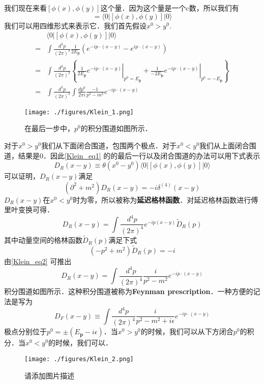 
我们现在来看$[\phi(x),\phi(y)]$这个量．因为这个量是一个c数，所以我们有
\begin{equation}
[\phi(x),\phi(y)] = \langle 0 | [\phi(x),\phi(y)] | 0 \rangle
\end{equation}
我们可以用四维形式来表示它．我们首先假设$x^0>y^0$.
\begin{equation}\label{Klein_eq1}
\begin{aligned}
& \langle 0|[\phi(x), \phi(y)]| 0\rangle\\
=&\int \frac{d^{3} p}{(2 \pi)^{3}} \frac{1}{2 E_{\mathbf{p}}}\left(e^{-i p \cdot(x-y)}-e^{i p \cdot(x-y)}\right) \\ 
=& \int \frac{d^{3} p}{(2 \pi)^{3}}\left\{\left.\frac{1}{2 E_{\mathbf{p}}} e^{-i p \cdot(x-y)}\right|_{p^{0}=E_{\mathbf{p}}}+\left.\frac{1}{-2 E_{\mathbf{p}}} e^{-i p \cdot(x-y)}\right|_{p^{0}=-E_{\mathbf{p}}}\right\} \\
=& \int \frac{d^{3} p}{(2 \pi)^{3}} \int \frac{d p^{0}}{2 \pi i} \frac{-1}{p^{2}-m^{2}} e^{-i p \cdot(x-y)} 
\end{aligned}
\end{equation}
\begin{figure}[ht]
\centering
\texttt{[image: ./figures/Klein\_1.png]}
\caption{在最后一步中，$p^0$的积分围道如图所示．} \label{Klein_fig1}
\end{figure}
对于$x^0>y^0$我们从下面闭合围道，包围两个极点．对于$x^0<y^0$我们从上面闭合围道，结果是0．因此\autoref{Klein_eq1} 的的最后一行以及闭合围道的办法可以用下式表示
\begin{equation}
D_R(x-y)\equiv \theta(x^0-y^0)\langle 0 | [\phi(x),\phi(y)]|0 \rangle
\end{equation}
可以证明，$D_R(x-y)$满足
\begin{equation}
(\partial^2+m^2)D_R(x-y) = -i \delta^{(4)}(x-y)
\end{equation}
$D_R(x-y)$在$x^0<y^0$时为零，所以被称为\textbf{延迟格林函数}．对延迟格林函数进行傅里叶变换可得．
\begin{equation}
D_R(x-y) = \int \frac{d^4p}{(2\pi)^4} e^{-ip(x-y)} \tilde D_R (p)
\end{equation}
其中动量空间的格林函数$\tilde D_R(p)$满足下式
\begin{equation}\label{Klein_eq2}
(-p^2+m^2) \tilde D_R(p) = -i
\end{equation}
由\autoref{Klein_eq2} 可推出
\begin{equation}
D_R (x-y) = \int \frac{d^4p}{(2\pi)^4} \frac{i}{p^2-m^2} e^{-ip\cdot(x-y)}
\end{equation}
积分围道如图所示．这种积分围道被称为\textbf{Feynman prescription}．一种方便的记法是写为
\begin{equation}
D_F(x-y) \equiv \int \frac{d^4p}{(2\pi)^4} \frac{i}{p^2-m^2+i\epsilon} e^{-ip\cdot(x-y)}
\end{equation}
极点分别位于$p^0 = \pm(E_{\mathbf p}-i\epsilon)$．当$x^0>y^0$的时候，我们可以从下方闭合$p^0$的积分．当$x^0<y^0$的时候，我们可以．
\begin{figure}[ht]
\centering
\texttt{[image: ./figures/Klein\_2.png]}
\caption{请添加图片描述} \label{Klein_fig2}
\end{figure}